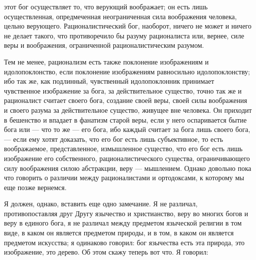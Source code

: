 \documentclass[12pt]{article}
\begin{document}
этот бог осуществляет то, что верующий воображает; он есть лишь осуществленная, опредмеченная неограниченная сила воображения человека, цельно верующего. Рационалистический бог, наоборот, ничего не может и ничего не делает такого, что противоречило бы разуму рационалиста или, вернее, силе веры и воображения, ограниченной рационалистическим разумом. 

Тем не менее, рационализм есть также поклонение изображениям и идолопоклонство, если поклонение изображениям равносильно идолопоклонству; ибо так же, как подлинный, чувственный идолопоклонник принимает чувственное изображение за бога, за действительное существо, точно так же и рационалист считает своего бога, создание своей веры, своей силы воображения и своего разума за действительное существо, живущее вне человека. Он приходит в бешенство и впадает в фанатизм старой веры, если у него оспаривается бытие бога или --- что то же --- его бога, ибо каждый считает за бога лишь своего бога, --- если ему хотят доказать, что его бог есть лишь субъективное, то есть воображаемое, представленное, измышленное существо, что его бог есть лишь изображение его собственного, рационалистического существа, ограничивающего силу воображения силою абстракции, веру --- мышлением. Однако довольно пока что говорить о различии между рационалистами и ортодоксами, к которому мы еще позже вернемся. 

Я должен, однако, вставить еще одно замечание. Я не различал, противопоставляя друг Другу язычество и христианство, веру во многих богов и веру в единого бога, я не различал между предметом языческой религии в том виде, в каком он является предметом природы, и в том, в каком он является предметом искусства; я одинаково говорил: бог язычества есть эта природа, это изображение, это дерево. Об этом скажу теперь вот что. Я говорил: 
\end{document}
